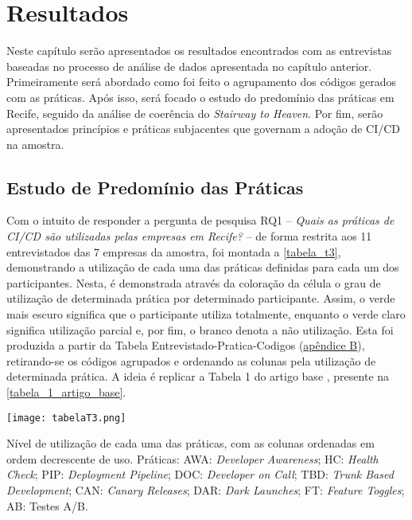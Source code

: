 \section{Resultados}

Neste capítulo serão apresentados os resultados encontrados com as entrevistas baseadas no processo de análise de dados apresentada no capítulo anterior. Primeiramente será abordado como foi feito o agrupamento dos códigos gerados com as práticas. Após isso, será focado o estudo do predomínio das práticas em Recife, seguido da análise de coerência do \emph{Stairway to Heaven}. Por fim, serão apresentados princípios e práticas subjacentes que governam a adoção de CI/CD na amostra.


\subsection{Estudo de Predomínio das Práticas}

Com o intuito de responder a pergunta de pesquisa RQ1 -- \emph{Quais as práticas de CI/CD são utilizadas pelas empresas em Recife?} -- de forma restrita aos 11 entrevistados das 7 empresas da amostra, foi montada a \ref{tabela_t3}, demonstrando a utilização de cada uma das práticas definidas para cada um dos participantes. Nesta, é demonstrada através da coloração da célula o grau de utilização de determinada prática por determinado participante. Assim, o verde mais escuro significa que o participante utiliza totalmente, enquanto o verde claro significa utilização parcial e, por fim, o branco denota a não utilização. Esta foi produzida a partir da Tabela Entrevistado-Pratica-Codigos (\hyperlink{tabela1}{apêndice B}), retirando-se os códigos agrupados e ordenando as colunas pela utilização de determinada prática. A ideia é replicar a Tabela 1 do artigo base \cite{empiricalStudy2016}, presente na \ref{tabela_1_artigo_base}.

\begin{table}[ht]
\begin{center}
\texttt{[image: tabelaT3.png]}
\end{center}
\caption[Nível de utilização das práticas, com as colunas em ordem decrescente de uso]{
    Nível de utilização de cada uma das práticas, com as colunas ordenadas em ordem decrescente de uso. Práticas: AWA: \emph{Developer Awareness}; HC: \emph{Health Check}; PIP: \emph{Deployment Pipeline}; DOC: \emph{Developer on Call}; TBD: \emph{Trunk Based Development}; CAN: \emph{Canary Releases}; DAR: \emph{Dark Launches}; FT: \emph{Feature Toggles}; AB: Testes A/B.
}\label{tabela_t3}
\end{table}

